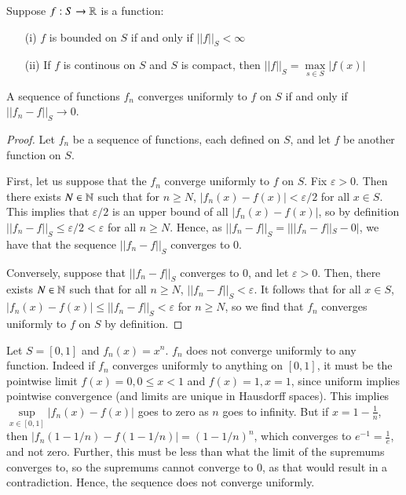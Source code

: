 \documentclass[12pt, a4paper, oneside, openright, titlepage]{book}
\begin{document}
\begin{rmk}
    Suppose $f:S\rightarrow \mathbb R$ is a function: \begin{enumerate}
        \item[(i)] $f$ is bounded on $S$ if and only if $||f||_S < \infty$
        \item[(ii)] If $f$ is continous on $S$ and $S$ is compact, then $||f||_S = \max\limits_{s \in S}|f(x)|$
    \end{enumerate}
\end{rmk}


\begin{prop}
    A sequence of functions $f_n$ converges uniformly to $f$ on $S$ if and only if $||f_n-f||_S\rightarrow 0$.
\end{prop}
\begin{proof}
    Let $f_n$ be a sequence of functions, each defined on $S$, and let $f$ be another function on $S$.

    First, let us suppose that the $f_n$ converge uniformly to $f$ on $S$. Fix $\varepsilon > 0$. Then there exists $N \in \mathbb N$ such that for $n \geq N$, $|f_n(x) - f(x)| < \varepsilon/2$ for all $x \in S$. This implies that $\varepsilon/2$ is an upper bound of all $|f_n(x)-f(x)|$, so by definition $||f_n-f||_S \leq \varepsilon/2 < \varepsilon$ for all $n \geq N$. Hence, as $||f_n-f||_S = |||f_n -f||_S - 0|$, we have that the sequence $||f_n-f||_S$ converges to $0$.

    Conversely, suppose that $||f_n-f||_S$ converges to $0$, and let $\varepsilon > 0$. Then, there exists $N \in \mathbb N$ such that for all $n \geq N$, $||f_n-f||_S < \varepsilon$. It follows that for all $x \in S$, $|f_n(x) - f(x)| \leq ||f_n-f||_S < \varepsilon$ for $n \geq N$, so we find that $f_n$ converges uniformly to $f$ on $S$ by definition.
\end{proof}

\begin{eg}
    Let $S = [0,1]$ and $f_n(x) = x^n$. $f_n$ does not converge uniformly to any function. Indeed if $f_n$ converges uniformly to anything on $[0,1]$, it must be the pointwise limit $f(x) = 0, 0 \leq x < 1$ and $f(x) = 1, x =1$, since uniform implies pointwise convergence (and limits are unique in Hausdorff spaces). This implies $\sup\limits_{x \in [0,1]}|f_n(x) - f(x)|$ goes to zero as $n$ goes to infinity. But if $x = 1-\frac{1}{n}$, then $|f_n(1-1/n)-f(1-1/n)| = (1-1/n)^n$, which converges to $e^{-1} = \frac{1}{e}$, and not zero. Further, this must be less than what the limit of the supremums converges to, so the supremums cannot converge to $0$, as that would result in a contradiction. Hence, the sequence does not converge uniformly.
\end{eg}
\end{document}
